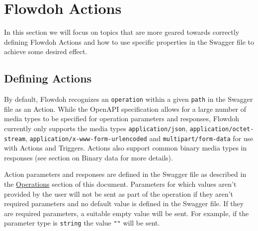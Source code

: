 \section{Flowdoh Actions}
\label{sec:actions}
In this section we will focus on topics that are more geared towards correctly defining Flowdoh Actions and how to use specific properties in the Swagger file to achieve some desired effect.
\subsection{Defining Actions}
By default, Flowdoh recognizes an \texttt{operation} within a given \texttt{path} in the Swagger file as an Action. While the OpenAPI specification allows for a large number of media types\cite{mediatypes} to be specified for operation parameters and responses, Flowdoh currently only supports the media types \texttt{application/json}, \texttt{application/octet-stream}, \texttt{application/x-www-form-urlencoded} and \texttt{multipart/form-data} for use with Actions and Triggers. Actions also support common binary media types in responses (see section on Binary data for more details).

Action parameters and responses are defined in the Swagger file as described in the \hyperref[subsubsec:operations]{Operations} section of this document. Parameters for which values aren't provided by the user will not be sent as part of the operation if they aren't required parameters and no default value is defined in the Swagger file. If they are required parameters, a suitable empty value will be sent. For example, if the parameter type is \texttt{string} the value \texttt{""} will be sent.

